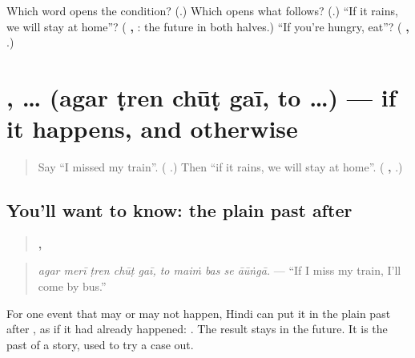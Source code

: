 \begin{tcolorbox}[breakable,colback=teal!4,colframe=teal!35!black,title={Before you move on}]
Which word opens the condition? (\textbf{}.) Which opens what follows? (\textbf{}.) \textquotedblleft{}If it rains, we will stay at home\textquotedblright{}? (\textbf{  ,     }: the future in both halves.) \textquotedblleft{}If you're hungry, eat\textquotedblright{}? (\textbf{    ,   }.)
\end{tcolorbox}
\section[\texorpdfstring{\hi{अगर} \hi{ट्रेन} \hi{छूट} \hi{गई} … (agar ṭren chūṭ …)}{अगर ट्रेन छूट गई … (agar ṭren chūṭ …)}]{   ,  … (agar ṭren chūṭ gaī, to …) — if it happens, and otherwise}

\label{lesson:HI-C286-chutgayito}



\begin{quote}
Say \textquotedblleft{}I missed my train\textquotedblright{}. (\textbf{   }.) Then \textquotedblleft{}if it rains, we will stay at home\textquotedblright{}. (\textbf{  ,     }.)
\end{quote}

\subsection*{You'll want to know: the plain past after }
\begin{quote}
\textbf{    ,     }
\end{quote}

\begin{quote}
\emph{agar merī ṭren chūṭ gaī, to maiṁ bas se āūṅgā.} — \textquotedblleft{}If I miss my train, I'll come by bus.\textquotedblright{}
\end{quote}

For one event that may or may not happen, Hindi can put it in the plain past after \textbf{}, as if it had already happened: \textbf{ }. The result stays in the future. It is the past of a story, used to try a case out.

